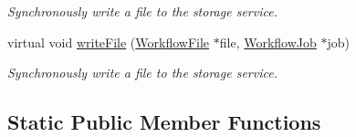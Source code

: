 \begin{DoxyCompactItemize}
\begin{DoxyCompactList}\small\item\em Synchronously write a file to the storage service. \end{DoxyCompactList}\item 
virtual void \hyperlink{classwrench_1_1_storage_service_a60e325584a9a9d450c4c51e8ec7ba96e}{write\+File} (\hyperlink{classwrench_1_1_workflow_file}{Workflow\+File} $\ast$file, \hyperlink{classwrench_1_1_workflow_job}{Workflow\+Job} $\ast$job)
\begin{DoxyCompactList}\small\item\em Synchronously write a file to the storage service. \end{DoxyCompactList}\end{DoxyCompactItemize}
\subsection*{Static Public Member Functions}
